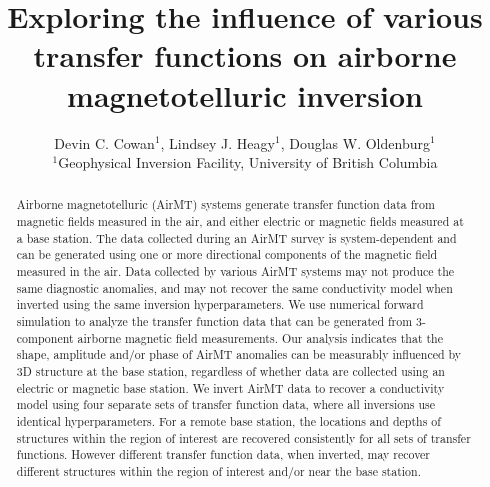 \documentclass{segabs}
\begin{document}
\title{Exploring the influence of various transfer functions on airborne magnetotelluric inversion}
\author{
Devin C. Cowan$^1$, Lindsey J. Heagy$^1$, Douglas W. Oldenburg$^1$ \\
$^1$Geophysical Inversion Facility, University of British Columbia \\
}
\maketitle

\begin{abstract}

\vspace{-15pt}
Airborne magnetotelluric (AirMT) systems generate transfer function data from magnetic fields measured in the air, and either electric or magnetic fields measured at a base station. The data collected during an AirMT survey is system-dependent and can be generated using one or more directional components of the magnetic field measured in the air. Data collected by various AirMT systems may not produce the same diagnostic anomalies, and may not recover the same conductivity model when inverted using the same inversion hyperparameters. We use numerical forward simulation to analyze the transfer function data that can be generated from 3-component airborne magnetic field measurements. Our analysis indicates that the shape, amplitude and/or phase of AirMT anomalies can be measurably influenced by 3D structure at the base station, regardless of whether data are collected using an electric or magnetic base station. We invert AirMT data to recover a conductivity model using four separate sets of transfer function data, where all inversions use identical hyperparameters. For a remote base station, the locations and depths of structures within the region of interest are recovered consistently for all sets of transfer functions. However different transfer function data, when inverted, may recover different structures within the region of interest and/or near the base station.
\end{abstract}

\vspace{-15pt}
\end{document}
